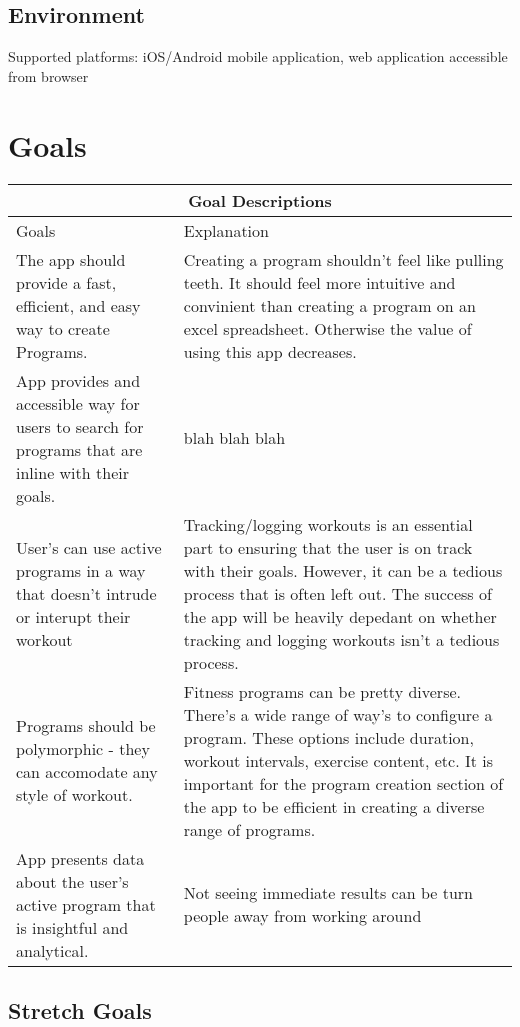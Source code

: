 \documentclass{article}
\begin{document}
\subsection{Environment}
Supported platforms: iOS/Android mobile application, web application accessible from browser


\section{Goals}

\begin{tabular}{ |p{5cm}|p{8cm}| }
	\hline
	\multicolumn{2}{|c|}{Goal Descriptions } \\
	\hline
	Goals & Explanation \\
	\hline
	The app should provide a fast, efficient, and easy way to create Programs. & Creating a program shouldn’t feel like pulling teeth. It should feel more intuitive and convinient than creating a program on an excel spreadsheet. Otherwise the value of using this app decreases.  \\
	\hline
	App provides and accessible way for users to search for programs that are inline with their goals. & blah blah blah \\
	\hline
	User’s can use active programs in a way that doesn’t intrude or interupt their workout & Tracking/logging workouts is an essential part to ensuring that the user is on track with their goals. However, it can be a tedious process that is often left out. The success of the app will be heavily depedant on whether tracking and logging workouts isn’t a tedious process. \\
	\hline
	Programs should be polymorphic - they can accomodate any style of workout. & Fitness programs can be pretty diverse. There’s a wide range of way’s to configure a program. These options include duration, workout intervals, exercise content, etc. It is important for the program creation section of the app to be efficient in creating a diverse range of programs. \\
  \hline
	App presents data about the user’s active program that is insightful and analytical. & Not seeing immediate results can be turn people away from working around \\
	\hline
\end{tabular}

\subsection{Stretch Goals}
\end{document}

